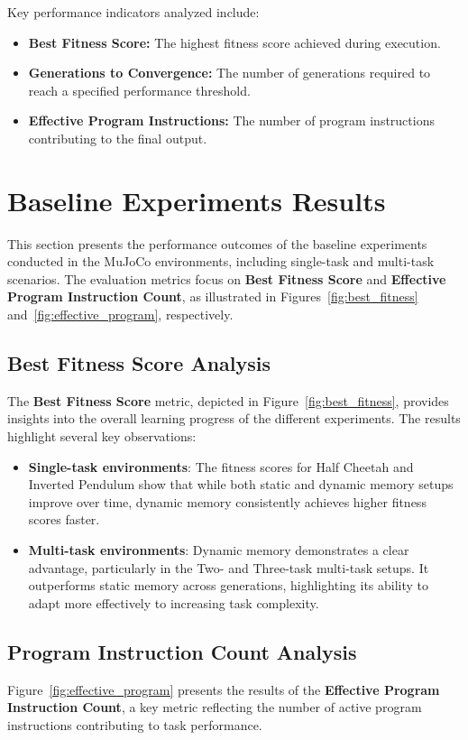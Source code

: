 \documentclass[sigconf]{acmart}
\begin{document}
Key performance indicators analyzed include:

\begin{itemize}
  \item \textbf{Best Fitness Score:} The highest fitness score achieved during execution.
  \item \textbf{Generations to Convergence:} The number of generations required to reach a specified performance threshold.
  \item \textbf{Effective Program Instructions:} The number of program instructions contributing to the final output.
\end{itemize}

\section{Baseline Experiments Results}
This section presents the performance outcomes of the baseline experiments conducted in 
the MuJoCo environments, including single-task and multi-task scenarios. The evaluation 
metrics focus on \textbf{Best Fitness Score} and \textbf{Effective Program Instruction Count}, as illustrated in 
Figures~\ref{fig:best_fitness} and~\ref{fig:effective_program}, respectively.

\subsection{Best Fitness Score Analysis}
The \textbf{Best Fitness Score} metric, depicted in Figure~\ref{fig:best_fitness}, provides insights into the overall 
learning progress of the different experiments. The results highlight several key observations:

\begin{itemize}
  \item \textbf{Single-task environments}: The fitness scores for Half Cheetah and Inverted Pendulum show that while both static and dynamic memory setups improve over time, dynamic memory consistently achieves higher fitness scores faster.
  \item \textbf{Multi-task environments}: Dynamic memory demonstrates a clear advantage, particularly in the Two- and Three-task multi-task setups. It outperforms static memory across generations, highlighting its ability to adapt more effectively to increasing task complexity.
\end{itemize}

\subsection{Program Instruction Count Analysis}
Figure~\ref{fig:effective_program} presents the results of the \textbf{Effective Program Instruction Count}, a key metric reflecting the number of active 
program instructions contributing to task performance.
\end{document}
